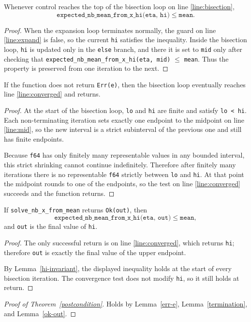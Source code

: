 \documentclass{article}
\begin{document}
\begin{lemma}
\label{hi-invariant}
Whenever control reaches the top of the bisection loop on line \ref{line:bisection},
\[
\texttt{expected\_nb\_mean\_from\_x\_hi(eta, hi)} \le \texttt{mean}.
\]
\end{lemma}

\begin{proof}
When the expansion loop terminates normally, the guard on line \ref{line:expand} is false, so the
current \texttt{hi} satisfies the inequality.
Inside the bisection loop, \texttt{hi} is updated only in the \texttt{else} branch, and there it is
set to \texttt{mid} only after checking that
\texttt{expected\_nb\_mean\_from\_x\_hi(eta, mid)} $\le$ \texttt{mean}.
Thus the property is preserved from one iteration to the next.
\end{proof}

\begin{lemma}
\label{termination}
If the function does not return \texttt{Err(e)}, then the bisection loop eventually reaches line
\ref{line:converged} and returns.
\end{lemma}

\begin{proof}
At the start of the bisection loop, \texttt{lo} and \texttt{hi} are finite and satisfy
\texttt{lo < hi}. Each non-terminating iteration sets exactly one endpoint to the midpoint on line
\ref{line:mid}, so the new interval is a strict subinterval of the previous one and still has
finite endpoints.

Because \texttt{f64} has only finitely many representable values in any bounded interval, this
strict shrinking cannot continue indefinitely. Therefore after finitely many iterations there is no
representable \texttt{f64} strictly between \texttt{lo} and \texttt{hi}. At that point the
midpoint rounds to one of the endpoints, so the test on line \ref{line:converged} succeeds and the
function returns.
\end{proof}

\begin{lemma}
\label{ok-out}
If \texttt{solve\_nb\_x\_from\_mean} returns \texttt{Ok(out)}, then
\[
\texttt{expected\_nb\_mean\_from\_x\_hi(eta, out)} \le \texttt{mean},
\]
and \texttt{out} is the final value of \texttt{hi}.
\end{lemma}

\begin{proof}
The only successful return is on line \ref{line:converged}, which returns \texttt{hi}; therefore
\texttt{out} is exactly the final value of the upper endpoint.

By Lemma~\ref{hi-invariant}, the displayed inequality holds at the start of every bisection
iteration. The convergence test does not modify \texttt{hi}, so it still holds at return.
\end{proof}

\begin{proof}[Proof of Theorem~\ref{postcondition}]
Holds by Lemma~\ref{err-e}, Lemma~\ref{termination}, and Lemma~\ref{ok-out}.
\end{proof}
\end{document}
